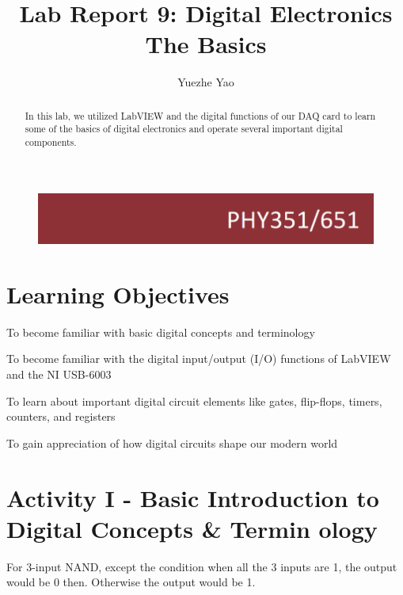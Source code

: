 \documentclass[11pt]{article}
\begin{document}
\begin{figure}
  \includegraphics[width=\linewidth/3]{title}
  \label{fig:title}
\end{figure}


\title{Lab Report 9: Digital Electronics The Basics}


\author{Yuezhe Yao}




\maketitle

\begin{abstract}
In this lab, we utilized LabVIEW and the digital functions of our DAQ card to learn some of the basics of digital electronics and operate several important digital components.      
\end{abstract}

\medskip

\begingroup
\let\clearpage\relax
\tableofcontents
\endgroup

\medskip
\medskip

\section{Learning Objectives}


To become familiar with basic digital concepts and terminology 

To become familiar with the digital input/output (I/O) functions of LabVIEW and the NI USB-6003

To learn about important digital circuit elements like gates, flip-flops, timers, counters, and registers

To gain appreciation of how digital circuits shape our modern world

\section{Activity I - Basic Introduction to Digital Concepts \& Termin
ology}


For 3-input NAND, except the condition when all the 3 inputs are 1, the output would be 0 then. Otherwise the output would be 1.
\end{document}
